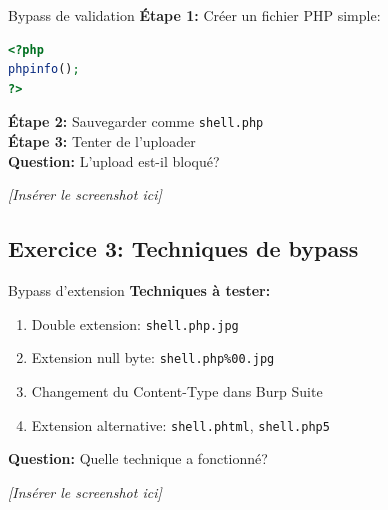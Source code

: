 \documentclass[12pt,a4paper]{article}
\begin{document}
\begin{exercicebox}{Bypass de validation}
\textbf{Étape 1:} Créer un fichier PHP simple:\\
\begin{lstlisting}[language=PHP]
<?php
phpinfo();
?>
\end{lstlisting}
\textbf{Étape 2:} Sauvegarder comme \texttt{shell.php}\\
\textbf{Étape 3:} Tenter de l'uploader\\
\textbf{Question:} L'upload est-il bloqué?
\end{exercicebox}

\begin{answerbox}
\vspace{7cm}
\end{answerbox}

\begin{screenshotbox}
\centering
\textit{[Insérer le screenshot ici]}
\end{screenshotbox}

\subsection{Exercice 3: Techniques de bypass}

\begin{exercicebox}{Bypass d'extension}
\textbf{Techniques à tester:}
\begin{enumerate}
    \item Double extension: \texttt{shell.php.jpg}
    \item Extension null byte: \texttt{shell.php\%00.jpg}
    \item Changement du Content-Type dans Burp Suite
    \item Extension alternative: \texttt{shell.phtml}, \texttt{shell.php5}
\end{enumerate}
\textbf{Question:} Quelle technique a fonctionné?
\end{exercicebox}

\begin{answerbox}
\vspace{7cm}
\end{answerbox}

\begin{screenshotbox}
\centering
\textit{[Insérer le screenshot ici]}
\end{screenshotbox}
\end{document}
